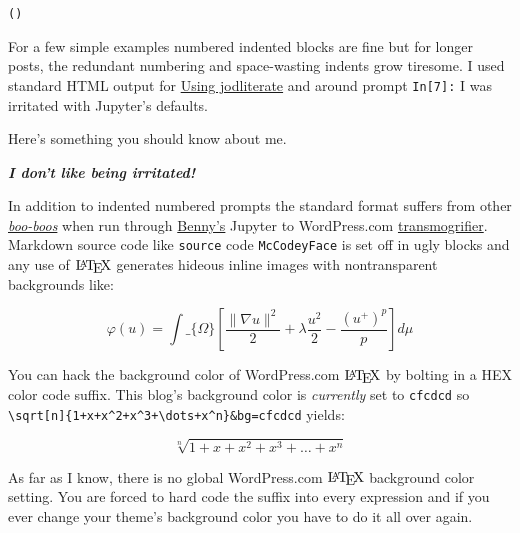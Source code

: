             \begin{tcolorbox}[breakable, size=fbox, boxrule=.5pt, pad at break*=1mm, opacityfill=0]
\begin{Verbatim}[commandchars=\\\{\}]
()
\end{Verbatim}
\end{tcolorbox}
        
    For a few simple examples numbered indented blocks are fine but for
longer posts, the redundant numbering and space-wasting indents grow
tiresome. I used standard HTML output for
\href{https://analyzethedatanotthedrivel.org/2020/05/25/using-jodliterate/}{Using
jodliterate} and around prompt \texttt{In{[}7{]}:} I was irritated with
Jupyter's defaults.

Here's something you should know about me.

\textbf{\emph{I don't like being irritated!}}

In addition to indented numbered prompts the standard format suffers
from other
\href{https://www.dictionary.com/browse/boo-boo}{\emph{boo-boos}} when
run through \href{https://github.com/bennylp}{Benny's} Jupyter to
WordPress.com
\href{https://calvinandhobbes.fandom.com/wiki/Transmogrifier}{transmogrifier}.
Markdown source code like \texttt{source} code \texttt{McCodeyFace} is
set off in ugly blocks and any use of \(\LaTeX\) generates hideous
inline images with nontransparent backgrounds like:

\begin{tcolorbox}[breakable, width=9cm, center, boxrule=1pt, pad at break*=1mm,colback=cellbackground, colframe=cellborder]
\[\varphi (u) = \int\_\{\Omega\} \left[
\dfrac{\|\nabla u\|^2}{2} +
\lambda\dfrac{u^2}{2} -
\dfrac{(u^+)^p}{p} \right] d\mu \]
\end{tcolorbox}

You can hack the background color of WordPress.com \(\LaTeX\) by bolting
in a HEX color code suffix. This blog's background color is
\emph{currently} set to \texttt{cfcdcd} so
\texttt{\textbackslash{}sqrt{[}n{]}\{1+x+x\^{}2+x\^{}3+\textbackslash{}dots+x\^{}n\}\&bg=cfcdcd}
yields:

\[ \sqrt[n]{1+x+x^2+x^3+\dots+x^n} \]

As far as I know, there is no global WordPress.com \(\LaTeX\) background
color setting. You are forced to hard code the suffix into every
expression and if you ever change your theme's background color you have
to do it all over again.

